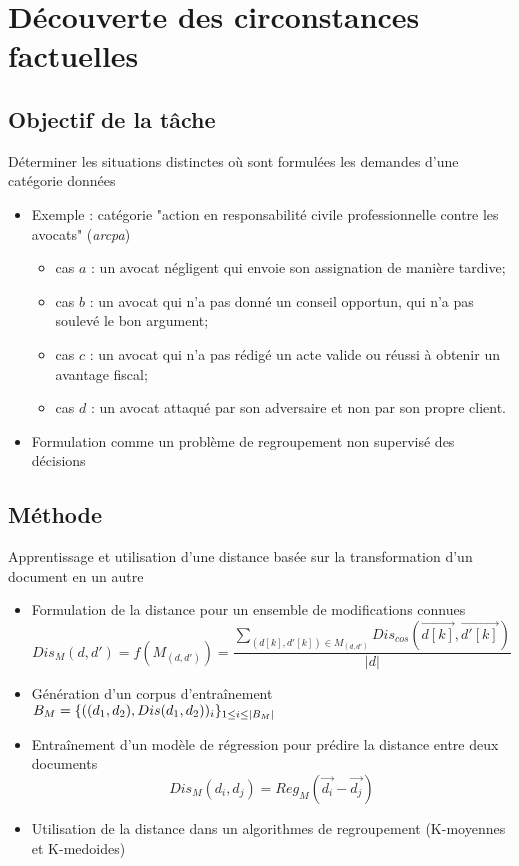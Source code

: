 \section{Découverte des circonstances factuelles}
\subsection{Objectif de la tâche}
\begin{frame}[t]{\mysubsectiontitle}
	Déterminer les situations distinctes où sont formulées les demandes d'une catégorie données
	\begin{itemize} \small
		\item Exemple : catégorie "action en responsabilité civile professionnelle contre les avocats" (\textit{arcpa})
			\begin{itemize}\scriptsize
				\item cas $a$ : un avocat négligent qui envoie son assignation de manière tardive; 
				\item cas $b$ : un avocat qui n'a pas donné un conseil opportun, qui n'a pas soulevé le bon argument;
				\item cas $c$ : un avocat qui n'a pas rédigé un acte valide ou réussi à obtenir un avantage fiscal; 
				\item cas $d$ : un avocat attaqué par son adversaire et non par son propre client.
			\end{itemize}
		\item Formulation comme un problème de regroupement non supervisé des décisions
	\end{itemize}
\end{frame}
\subsection{Méthode}
\begin{frame}[t]{\mysubsectiontitle}
	Apprentissage et utilisation d'une distance basée sur la transformation d'un document en un autre
	\begin{itemize} \scriptsize
		\item Formulation de la distance pour un ensemble de modifications connues	
		\[{Dis_{M}}(d,d') = {f}({M}_{(d,d')}) = \frac{\sum\limits_{(d[k], d'[k]) \in {M}_{(d,d')}} Dis_{cos}(\overrightarrow{d[k]}, \overrightarrow{d'[k]})}{\vert d \vert}\] 
		\item Génération d'un corpus d'entraînement	$B_{M} = \lbrace ((d_1, d_2), {Dis}(d_1, d_2))_i\rbrace_{1 \leq i \leq {\vert B_{M}\vert}}$
		\item Entraînement d'un modèle de régression pour prédire la distance entre deux documents \[Dis_{M}(d_i, d_j) = Reg_{M}(\vec{d_{i}} - \vec{d_{j}})\]	
		\item Utilisation de la distance dans un algorithmes de regroupement (K-moyennes et K-medoides)
	\end{itemize}	
\end{frame}

